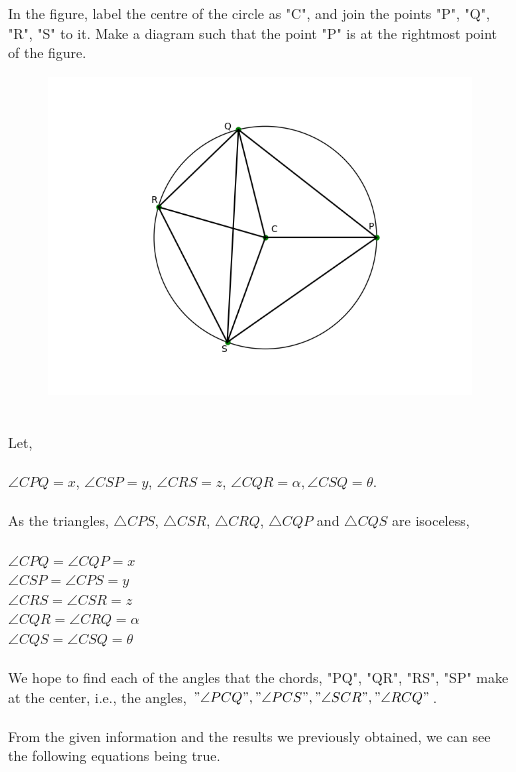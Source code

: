 \documentclass[8pt, twocolumn]{article}
\begin{document}
In the figure, label the centre of the circle as "C", and join the points "P", "Q", "R", "S" to it. Make a diagram such that the point "P" is at the rightmost point of the figure. \\
\begin{figure}[ht]
    \centering
    \includegraphics[scale = 0.5]{figs/pre_cnstrct_fig1.png}
    \end{figure}\\
Let,\\\\
$\angle CPQ = x$, $\angle CSP = y$, $\angle CRS = z$, $\angle CQR = \alpha, \angle CSQ = \theta .$\\\\
As the triangles, $\triangle CPS$, $\triangle CSR$, $\triangle CRQ$, $\triangle CQP$ and $\triangle CQS$ are isoceless,\\\\
$\angle CPQ = \angle CQP = x$\\
$\angle CSP = \angle CPS = y$\\
$\angle CRS = \angle CSR = z$\\
$\angle CQR = \angle CRQ = \alpha$\\
$\angle CQS = \angle CSQ = \theta$\\\\
We hope to find each of the angles that the chords, "PQ", "QR", "RS", "SP" make at the center, i.e., the angles, $"\angle PCQ", "\angle PCS", "\angle SCR", "\angle RCQ"$.\\\\
From the given information and the results we previously obtained, we can see the following equations being true.
\end{document}

